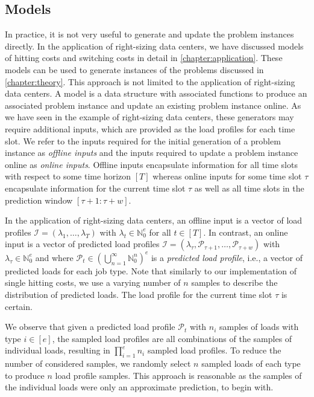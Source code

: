 \subsection{Models}

In practice, it is not very useful to generate and update the problem instances directly. In the application of right-sizing data centers, we have discussed models of hitting costs and switching costs in detail in \autoref{chapter:application}. These models can be used to generate instances of the problems discussed in \autoref{chapter:theory}. This approach is not limited to the application of right-sizing data centers. A model is a data structure with associated functions to produce an associated problem instance and update an existing problem instance online. As we have seen in the example of right-sizing data centers, these generators may require additional inputs, which are provided as the load profiles for each time slot. We refer to the inputs required for the initial generation of a problem instance as \emph{offline inputs} and the inputs required to update a problem instance online as \emph{online inputs}. Offline inputs encapsulate information for all time slots with respect to some time horizon $[T]$ whereas online inputs for some time slot $\tau$ encapsulate information for the current time slot $\tau$ as well as all time slots in the prediction window $[\tau + 1 : \tau + w]$.

In the application of right-sizing data centers, an offline input is a vector of load profiles $\mathcal{I} = (\lambda_1, \dots, \lambda_T)$ with $\lambda_t \in \mathbb{N}_0^e$ for all $t \in [T]$. In contrast, an online input is a vector of predicted load profiles $\mathcal{I} = (\lambda_{\tau}, \mathcal{P}_{\tau + 1}, \dots, \mathcal{P}_{\tau + w})$ with $\lambda_{\tau} \in \mathbb{N}_0^e$ and where $\mathcal{P}_t \in \left(\bigcup_{n=1}^{\infty} \mathbb{N}_0^n\right)^e$ is a \emph{predicted load profile}, i.e., a vector of predicted loads for each job type. Note that similarly to our implementation of single hitting costs, we use a varying number of $n$ samples to describe the distribution of predicted loads. The load profile for the current time slot $\tau$ is certain.

We observe that given a predicted load profile $\mathcal{P}_t$ with $n_i$ samples of loads with type $i \in [e]$, the sampled load profiles are all combinations of the samples of individual loads, resulting in $\prod_{i=1}^e n_i$ sampled load profiles. To reduce the number of considered samples, we randomly select $n$ sampled loads of each type to produce $n$ load profile samples. This approach is reasonable as the samples of the individual loads were only an approximate prediction, to begin with.

